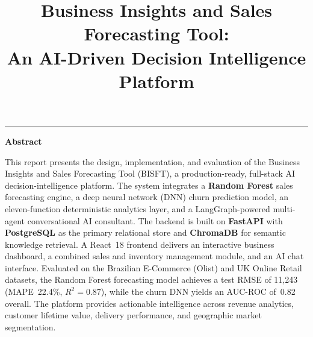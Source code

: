 \documentclass[conference]{IEEEtran}
\begin{document}
\begin{center}
\vspace{1.8cm}
{\color{bisftBlue}\rule{0.55\textwidth}{0.5pt}}
\vspace{0.6cm}

\begin{minipage}{0.82\textwidth}
\begin{center}{\large\bfseries Abstract}\end{center}
\small
This report presents the design, implementation, and evaluation of the Business Insights and Sales
Forecasting Tool (BISFT), a production-ready, full-stack AI decision-intelligence platform.
The system integrates a \textbf{Random Forest} sales forecasting engine, a deep neural network (DNN)
churn prediction model, an eleven-function deterministic analytics layer, and a LangGraph-powered
multi-agent conversational AI consultant.  The backend is built on \textbf{FastAPI} with
\textbf{PostgreSQL} as the primary relational store and \textbf{ChromaDB} for semantic knowledge
retrieval. A React~18 frontend delivers an interactive business dashboard, a combined sales and
inventory management module, and an AI chat interface.  Evaluated on the Brazilian E-Commerce
(Olist) and UK Online Retail datasets, the Random Forest forecasting model achieves a test
RMSE of 11{,}243 (MAPE~22.4\%, $R^{2}\!=\!0.87$), while the churn DNN yields an AUC-ROC
of~0.82 overall.  The platform provides actionable intelligence across revenue analytics,
customer lifetime value, delivery performance, and geographic market segmentation.
\end{minipage}

\end{center}
\clearpage

\twocolumn

\title{%
  Business Insights and Sales Forecasting Tool:\\
  An AI-Driven Decision Intelligence Platform%
}

\author{%
}

\maketitle
\end{document}
